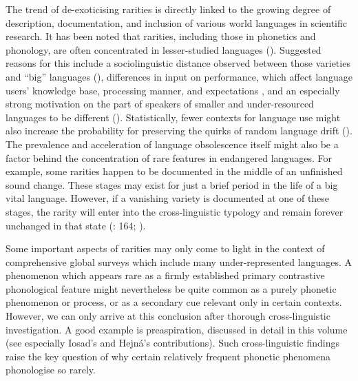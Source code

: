 \documentclass[output=paper]{langscibook}
\begin{document}
The trend of de-exoticising rarities is directly linked to the growing degree of description, documentation, and inclusion of various world languages in scientific research. It has been noted that rarities, including those in phonetics and phonology, are often concentrated in lesser-studied languages (\citealt{Mithun2007, WhalenMcDonough2019, TuckerWright2020, ZellouEtAl2022}). Suggested reasons for this include a sociolinguistic distance observed between those varieties and “big” languages (\citealt{MansfieldStanford2017}), differences in input on performance, which affect language users’ knowledge base, processing manner, and expectations \citep{Lev-Ari2016}, and an especially strong motivation on the part of speakers of smaller and under-resourced languages to be different (\citealt{BirdKell2017}). Statistically, fewer contexts for language use might also increase the probability for preserving the quirks of random language drift (\citealt{Bird2008, JägerForthcoming}). The prevalence and acceleration of language obsolescence itself might also be a factor behind the concentration of rare features in endangered languages. For example, some rarities happen to be documented in the middle of an unfinished sound change. These stages may exist for just a brief period in the life of a big vital language. However, if a vanishing variety is documented at one of these stages, the rarity will enter into the cross-linguistic typology and remain forever unchanged in that state (\citealt{Kuznetsova2021}: 164; \citealt{KuznetsovaMarkus2022}).

Some important aspects of rarities may only come to light in the context of comprehensive global surveys which include many under-represented languages. A phenomenon which appears rare as a firmly established primary contrastive phonological feature might nevertheless be quite common as a purely phonetic phenomenon or process, or as a secondary cue relevant only in certain contexts. However, we can only arrive at this conclusion after thorough cross-linguistic investigation. A good example is preaspiration, discussed in detail in this volume (see especially Iosad’s and Hejná’s contributions). Such cross-linguistic findings raise the key question of why certain relatively frequent phonetic phenomena phonologise so rarely.
\end{document}
